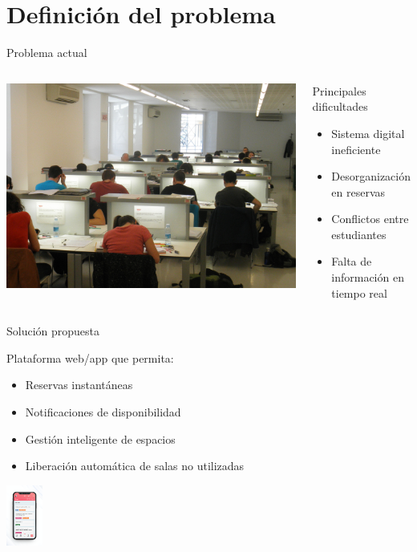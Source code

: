 \documentclass[10pt]{beamer}
\begin{document}
\section{Definición del problema}
\begin{frame}{Problema actual}
\begin{columns}
\includegraphics[width=\textwidth]{assets/ocupada.jpg} %
\begin{alertblock}{Principales dificultades}
\begin{itemize}[leftmargin=*]
\item Sistema digital ineficiente
\item Desorganización en reservas
\item Conflictos entre estudiantes
\item Falta de información en tiempo real
\end{itemize}
\end{alertblock}
\end{columns}
\end{frame}

\begin{frame}{Solución propuesta}
\begin{center}
\Large Plataforma web/app que permita:
\end{center}

\begin{itemize}
\item Reservas instantáneas
\item Notificaciones de disponibilidad
\item Gestión inteligente de espacios
\item Liberación automática de salas no utilizadas
\end{itemize}

\begin{center}
\includegraphics[height=2cm]{assets/app.png} %
\end{center}
\end{frame}
\end{document}
